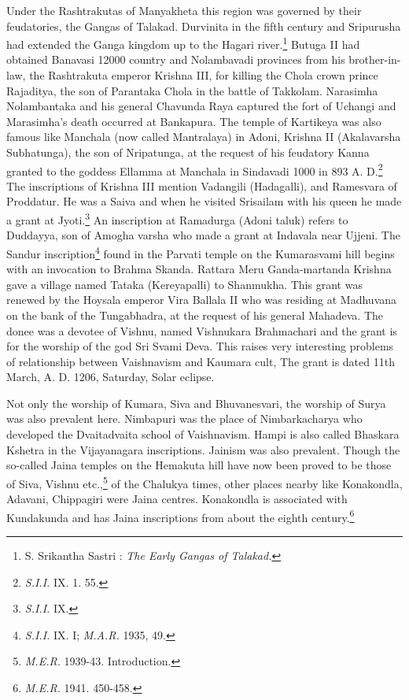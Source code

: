 \documentclass{book}
\begin{document}
Under the Rashtrakutas of Manyakheta this region was governed by their feudatories, the Gangas of Talakad. Durvinita in the fifth century and Sripurusha had extended the Ganga kingdom up to the Hagari river.\footnote[13]{S. Srikantha Sastri : {\em The Early Gangas of Talakad.}} Butuga II had obtained Banavasi 12000 country and Nolambavadi provinces from his brother-in-law, the Rashtrakuta emperor Krishna III, for killing the Chola crown prince Rajaditya, the son of Parantaka Chola in the battle of Takkolam. Narasimha Nolambantaka and his general Chavunda Raya captured the fort of Uchangi and Marasimha's death occurred at Bankapura. The temple of Kartikeya was also famous like Manchala (now called Mantralaya) in Adoni, Krishna II (Akalavarsha Subhatunga), the son of Nripatunga, at the request of his feudatory Kanna granted to the goddess Ellamma at Manchala in Sindavadi 1000 in 893 A. D.\footnote[14]{{\em S.I.I.} IX. 1. 55.} The inscriptions of Krishna III mention Vadangili (Hadagalli), and Ramesvara of Proddatur. He was a Saiva and when he visited Srisailam with his queen he made a grant at Jyoti.\footnote[15]{{\em S.I.I.} IX.} An inscription at Ramadurga (Adoni taluk) refers to Duddayya, son of Amogha varsha who made a grant at Indavala near Ujjeni. The Sandur inscription\footnote[16]{{\em S.I.I.} IX. I; {\em M.A.R.} 1935, 49.} found in the Parvati temple on the Kumarasvami hill begins with an invocation to Brahma Skanda. Rattara Meru Ganda-martanda Krishna gave a village named Tataka (Kereyapalli) to Shanmukha. This grant was renewed by the Hoysala emperor Vira Ballala II who was residing at Madhuvana on the bank of the Tungabhadra, at the request of his general Mahadeva. The donee was a devotee of Vishnu, named Vishnukara Brahmachari and the grant is for the worship of the god Sri Svami Deva. This raises very interesting problems of relationship between Vaishnavism and Kaumara cult, The grant is dated 11th March, A. D. 1206, Saturday, Solar eclipse.

Not only the worship of Kumara, Siva and Bhuvanesvari, the worship of Surya was also prevalent here. Nimbapuri was the place of Nimbarkacharya who developed the Dvaitadvaita school of Vaishnavism. Hampi is also called Bhaskara Kshetra in the Vijayanagara inscriptions. Jainism was also prevalent. Though the so-called Jaina temples on the Hemakuta hill have now been proved to be those of Siva, Vishnu etc.,\footnote[17]{{\em M.E.R.} 1939-43. Introduction.} of the Chalukya times, other places nearby like Konakondla, Adavani, Chippagiri were Jaina centres. Konakondla is associated with Kundakunda and has Jaina inscriptions from about the eighth century.\footnote[18]{{\em M.E.R.} 1941. 450-458.}
\end{document}
